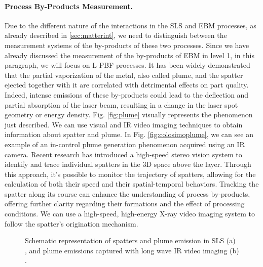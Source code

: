 \paragraph{Process By-Products Measurement.} Due to the different nature of the interactions in the SLS and EBM processes, as already described in \ref{sec:matterint}, we need to distinguish between the measurement systems of the by-products of these two processes. Since we have already discussed the measurement of the by-products of EBM in level 1, in this paragraph, we will focus on L-PBF processes. It has been widely demonstrated that the partial vaporization of the metal, also called plume, and the spatter ejected together with it are correlated with detrimental effects on part quality. Indeed, intense emissions of these by-products could lead to the deflection and partial absorption of the laser beam, resulting in a change in the laser spot geometry or energy density. Fig. \ref{fig:plume} visually represents the phenomenon just described. We can use visual and IR video imaging techniques to obtain information about spatter and plume. In Fig. \ref{fig:colosimoplume}, we can see an example of an in-control plume generation phenomenon acquired using an IR camera. Recent research has introduced a high-speed stereo vision system to identify and trace individual spatters in the 3D space above the layer. Through this approach, it's possible to monitor the trajectory of spatters, allowing for the calculation of both their speed and their spatial-temporal behaviors. Tracking the spatter along its course can enhance the understanding of process by-products, offering further clarity regarding their formations and the effect of processing conditions. We can use a high-speed, high-energy X-ray video imaging system to follow the spatter's origination mechanism.
\begin{figure}
    \centering
    \qquad
    \caption[Spatters and plume in SLS]{Schematic representation of spatters and plume emission in SLS (a) \cite{grasso_-situ_2021}, and plume emissions captured with long wave IR video imaging (b) \cite{grasso_statistical_2019}.}
\end{figure}

